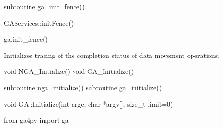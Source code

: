 \documentclass[12pt]{article}
\begin{document}
\begin{fapi}
\begin{fcode}
subroutine ga_init_fence()
\end{fcode}
\end{fapi}

\begin{cxxapi}
\begin{cxxcode}
GAServices::initFence()
\end{cxxcode}
\end{cxxapi}

\begin{pyapi}
\begin{pycode}
ga.init_fence()
\end{pycode}
\end{pyapi}

\local

\begin{desc}

Initializes tracing of the completion status of data movement operations.

\end{desc}


\begin{capi}
\begin{ccode}
void NGA_Initialize()
void GA_Initialize()
\end{ccode}
\end{capi}

\begin{fapi}
\begin{fcode}
subroutine nga_initialize()
subroutine ga_initialize()
\end{fcode}
\end{fapi}

\begin{cxxapi}
\begin{cxxcode}
void GA::Initialize(int argc, char *argv[], size_t limit=0)
\end{cxxcode}
\begin{funcargs}
\end{funcargs}
\end{cxxapi}

\begin{pyapi}
\begin{pycode}
from ga4py import ga
\end{pycode}
\end{pyapi}
\end{document}

